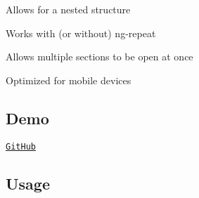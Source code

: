 
\begin{DoxyItemize}
\item Allows for a nested structure
\item Works with (or without) {\ttfamily ng-\/repeat}
\item Allows multiple sections to be open at once
\item Optimized for mobile devices
\end{DoxyItemize}

\subsection*{Demo}


\begin{DoxyItemize}
\item \href{http://lukaszwatroba.github.io/v-accordion}{\tt Git\+Hub}
\end{DoxyItemize}

\subsection*{Usage}


